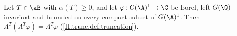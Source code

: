 Let $T\in\aB$ with $\alpha(T)\ge0$, and let $\varphi\colon G(\A)^1\to\C$ be Borel, left $G(\Q)$-invariant and bounded on every compact subset of
$G(\A)^1$. Then $\Lambda^T(\Lambda^T\varphi)=\Lambda^T\varphi$ (\cref{II.trunc.def:truncation}).
